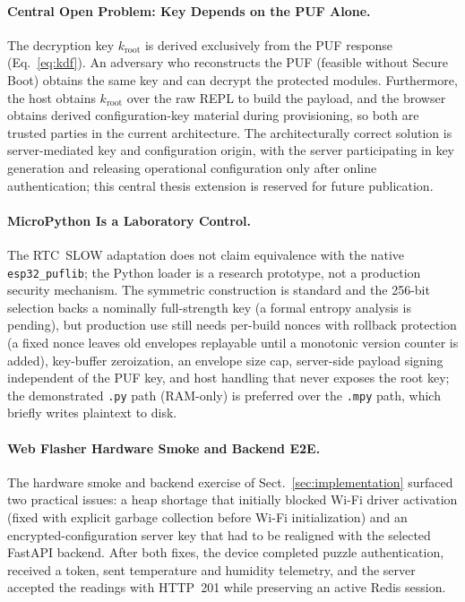 \documentclass[runningheads]{llncs}
\begin{document}
\paragraph{Central Open Problem: Key Depends on the PUF Alone.}
The decryption key $k_{\mathrm{root}}$ is derived exclusively from the PUF response (Eq.~\ref{eq:kdf}). An adversary who reconstructs the PUF (feasible without Secure Boot) obtains the same key and can decrypt the protected modules. Furthermore, the host obtains $k_{\mathrm{root}}$ over the raw REPL to build the payload, and the browser obtains derived configuration-key material during provisioning, so both are trusted parties in the current architecture. The architecturally correct solution is server-mediated key and configuration origin, with the server participating in key generation and releasing operational configuration only after online authentication; this central thesis extension is reserved for future publication.

\paragraph{MicroPython Is a Laboratory Control.}
The RTC~SLOW adaptation does not claim equivalence with the native \texttt{esp32\_puflib}; the Python loader is a research prototype, not a production security mechanism. The symmetric construction is standard and the 256-bit selection backs a nominally full-strength key (a formal entropy analysis is pending), but production use still needs per-build nonces with rollback protection (a fixed nonce leaves old envelopes replayable until a monotonic version counter is added), key-buffer zeroization, an envelope size cap, server-side payload signing independent of the PUF key, and host handling that never exposes the root key; the demonstrated \texttt{.py} path (RAM-only) is preferred over the \texttt{.mpy} path, which briefly writes plaintext to disk.

\paragraph{Web Flasher Hardware Smoke and Backend E2E.}
The hardware smoke and backend exercise of Sect.~\ref{sec:implementation} surfaced two practical issues: a heap shortage that initially blocked Wi-Fi driver activation (fixed with explicit garbage collection before Wi-Fi initialization) and an encrypted-configuration server key that had to be realigned with the selected FastAPI backend. After both fixes, the device completed puzzle authentication, received a token, sent temperature and humidity telemetry, and the server accepted the readings with HTTP~201 while preserving an active Redis session.
\end{document}
